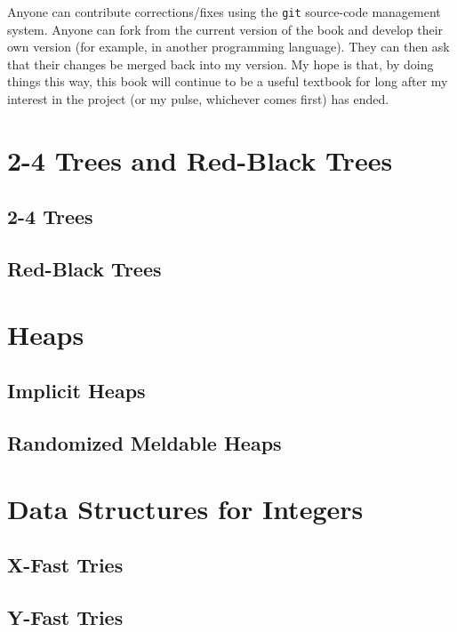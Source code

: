 \documentclass[11pt]{book}
\begin{document}
Anyone can contribute corrections/fixes using the \texttt{git} source-code
management system.  Anyone can fork from the current version of the
book and develop their own version (for example, in another programming
language).  They can then ask that their changes be merged back into
my version.  My hope is that, by doing things this way, this book will
continue to be a useful textbook for long after my interest in the project
(or my pulse, whichever comes first) has ended.











\chapter{2-4 Trees and Red-Black Trees}
\section{2-4 Trees}
\section{Red-Black Trees}

\chapter{Heaps}
\section{Implicit Heaps}
\section{Randomized Meldable Heaps}

\chapter{Data Structures for Integers}
\section{X-Fast Tries}
\section{Y-Fast Tries}
\end{document}
